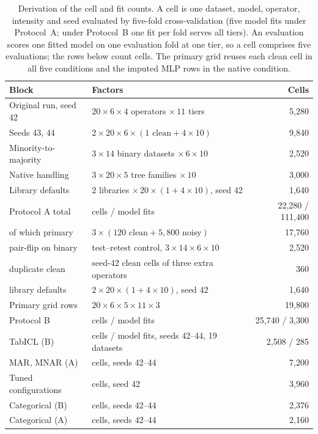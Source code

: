 \documentclass[pdflatex,sn-mathphys]{sn-jnl}
\theoremstyle{thmstyleone}
\theoremstyle{thmstyletwo}
\theoremstyle{thmstylethree}
\begin{document}
\begin{table}[t]
\centering
\footnotesize
\caption{Derivation of the cell and fit counts. A cell is one dataset, model, operator, intensity and seed evaluated by five-fold cross-validation (five model fits under Protocol~A; under Protocol~B one fit per fold serves all tiers). An evaluation scores one fitted model on one evaluation fold at one tier, so a cell comprises five evaluations; the rows below count cells. The primary grid reuses each clean cell in all five conditions and the imputed MLP rows in the native condition.}
\label{tab:accounting}
\begin{tabular}{@{}p{3.3cm}p{5.2cm}r@{}}
\toprule
Block & Factors & Cells \\
\midrule
Original run, seed 42 & $20\times6\times4$ operators $\times\,11$ tiers & 5{,}280 \\
Seeds 43, 44 & $2\times20\times6\times(1\text{ clean}+4\times10)$ & 9{,}840 \\
Minority-to-majority & $3\times14$ binary datasets $\times\,6\times10$ & 2{,}520 \\
Native handling & $3\times20\times5$ tree families $\times\,10$ & 3{,}000 \\
Library defaults & $2$ libraries $\times\,20\times(1+4\times10)$, seed 42 & 1{,}640 \\
\midrule
Protocol A total & cells / model fits & 22{,}280 / 111{,}400 \\
\quad of which primary & $3\times(120\text{ clean}+5{,}800\text{ noisy})$ & 17{,}760 \\
\quad pair-flip on binary & test--retest control, $3\times14\times6\times10$ & 2{,}520 \\
\quad duplicate clean & seed-42 clean cells of three extra operators & 360 \\
\quad library defaults & $2\times20\times(1+4\times10)$, seed 42 & 1{,}640 \\
Primary grid rows & $20\times6\times5\times11\times3$ & 19{,}800 \\
Protocol B & cells / model fits & 25{,}740 / 3{,}300 \\
TabICL (B) & cells / model fits, seeds 42--44, 19 datasets & 2{,}508 / 285 \\
MAR, MNAR (A) & cells, seeds 42--44 & 7{,}200 \\
Tuned configurations & cells, seed 42 & 3{,}960 \\
Categorical (B) & cells, seeds 42--44 & 2{,}376 \\
Categorical (A) & cells, seeds 42--44 & 2{,}160 \\
\bottomrule
\end{tabular}
\end{table}
\end{document}
